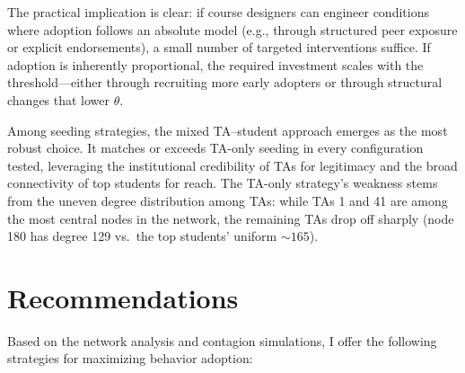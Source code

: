 \documentclass[12pt]{article}
\begin{document}
The practical implication is clear: if course designers can engineer conditions where adoption follows an absolute model (e.g., through structured peer exposure or explicit endorsements), a small number of targeted interventions suffice. If adoption is inherently proportional, the required investment scales with the threshold---either through recruiting more early adopters or through structural changes that lower $\theta$.

Among seeding strategies, the mixed TA--student approach emerges as the most robust choice. It matches or exceeds TA-only seeding in every configuration tested, leveraging the institutional credibility of TAs for legitimacy and the broad connectivity of top students for reach. The TA-only strategy's weakness stems from the uneven degree distribution among TAs: while TAs 1 and 41 are among the most central nodes in the network, the remaining TAs drop off sharply (node 180 has degree 129 vs.\ the top students' uniform ${\sim}165$).

\section{Recommendations}

Based on the network analysis and contagion simulations, I offer the following strategies for maximizing behavior adoption:
\end{document}
